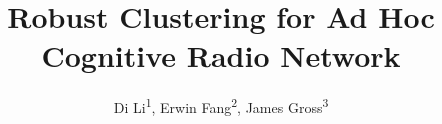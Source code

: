 \documentclass[times]{ettauth}
\theoremstyle{mytheoremstyle}
\theoremstyle{mytheoremstyle}
\theoremstyle{mytheoremstyle}
\begin{document}


\title{Robust Clustering for Ad Hoc Cognitive Radio Network}
\author{Di Li\textsuperscript{1}\corrauth, Erwin Fang\textsuperscript{2}, James Gross\textsuperscript{3}}
\address{RWTH Aachen University\textsuperscript{1}, Swisscom (Schweiz) AG\textsuperscript{2}, KTH Royal Institute of Technology\textsuperscript{3} }




\begin{abstract}
\end{abstract}
\end{document}
